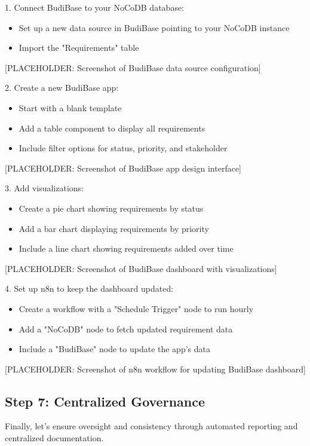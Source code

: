1. Connect BudiBase to your NoCoDB database:
\begin{itemize}
    \item Set up a new data source in BudiBase pointing to your NoCoDB instance
    \item Import the "Requirements" table
\end{itemize}

[PLACEHOLDER: Screenshot of BudiBase data source configuration]

2. Create a new BudiBase app:
\begin{itemize}
    \item Start with a blank template
    \item Add a table component to display all requirements
    \item Include filter options for status, priority, and stakeholder
\end{itemize}

[PLACEHOLDER: Screenshot of BudiBase app design interface]

3. Add visualizations:
\begin{itemize}
    \item Create a pie chart showing requirements by status
    \item Add a bar chart displaying requirements by priority
    \item Include a line chart showing requirements added over time
\end{itemize}

[PLACEHOLDER: Screenshot of BudiBase dashboard with visualizations]

4. Set up n8n to keep the dashboard updated:
\begin{itemize}
    \item Create a workflow with a "Schedule Trigger" node to run hourly
    \item Add a "NoCoDB" node to fetch updated requirement data
    \item Include a "BudiBase" node to update the app's data
\end{itemize}

[PLACEHOLDER: Screenshot of n8n workflow for updating BudiBase dashboard]

\subsection{Step 7: Centralized Governance}

Finally, let's ensure oversight and consistency through automated reporting and centralized documentation.

